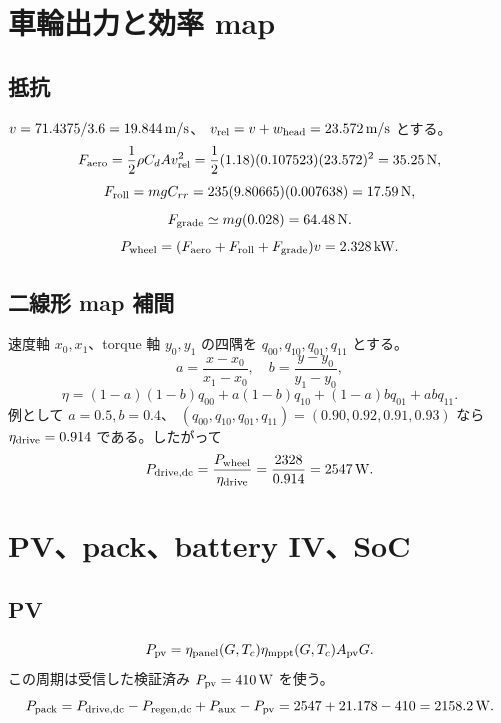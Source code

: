 
\section{車輪出力と効率 map}
\subsection{抵抗}
$v=71.4375/3.6=19.844\,{\rm m/s}$、
$v_{\rm rel}=v+w_{\rm head}=23.572\,{\rm m/s}$ とする。
\[
 F_{\rm aero}=\frac{1}{2}\rho C_dA v_{\rm rel}^2
 =\frac{1}{2}(1.18)(0.107523)(23.572)^2=35.25\,{\rm N},
\]
\[
 F_{\rm roll}=mgC_{rr}=235(9.80665)(0.007638)=17.59\,{\rm N},
\]
\[
 F_{\rm grade}\simeq mg(0.028)=64.48\,{\rm N}.
\]
\[
 P_{\rm wheel}=(F_{\rm aero}+F_{\rm roll}+F_{\rm grade})v
 =2.328\,{\rm kW}.
\]

\subsection{二線形 map 補間}
速度軸 $x_0,x_1$、torque 軸 $y_0,y_1$ の四隅を
$q_{00},q_{10},q_{01},q_{11}$ とする。
\[
 a=\frac{x-x_0}{x_1-x_0},\quad b=\frac{y-y_0}{y_1-y_0},
\]
\[
 \eta=(1-a)(1-b)q_{00}+a(1-b)q_{10}+(1-a)bq_{01}+abq_{11}.
\]
例として $a=0.5,b=0.4$、
$(q_{00},q_{10},q_{01},q_{11})=(0.90,0.92,0.91,0.93)$ なら
$\eta_{\rm drive}=0.914$ である。したがって
\[
 P_{\rm drive,dc}=\frac{P_{\rm wheel}}{\eta_{\rm drive}}
 =\frac{2328}{0.914}=2547\,{\rm W}.
\]


\section{PV、pack、battery IV、SoC}
\subsection{PV}
\[
 P_{\rm pv}=\eta_{\rm panel}(G,T_c)\eta_{\rm mppt}(G,T_c)A_{\rm pv}G.
\]
この周期は受信した検証済み $P_{\rm pv}=410\,{\rm W}$ を使う。
\[
 P_{\rm pack}=P_{\rm drive,dc}-P_{\rm regen,dc}
 +P_{\rm aux}-P_{\rm pv}
 =2547+21.178-410=2158.2\,{\rm W}.
\]

